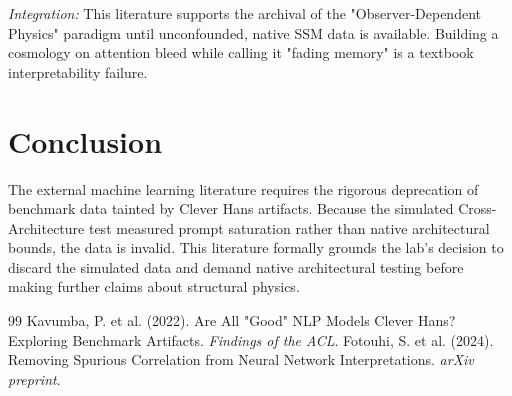 \documentclass[12pt,a4paper]{article}
\begin{document}
\textit{Integration:} This literature supports the archival of the "Observer-Dependent Physics" paradigm until unconfounded, native SSM data is available. Building a cosmology on attention bleed while calling it "fading memory" is a textbook interpretability failure.

\section{Conclusion}

The external machine learning literature requires the rigorous deprecation of benchmark data tainted by Clever Hans artifacts. Because the simulated Cross-Architecture test measured prompt saturation rather than native architectural bounds, the data is invalid. This literature formally grounds the lab's decision to discard the simulated data and demand native architectural testing before making further claims about structural physics.

\begin{thebibliography}{99}
 Kavumba, P. et al. (2022). Are All "Good" NLP Models Clever Hans? Exploring Benchmark Artifacts. \emph{Findings of the ACL}.
 Fotouhi, S. et al. (2024). Removing Spurious Correlation from Neural Network Interpretations. \emph{arXiv preprint}.
\end{thebibliography}
\end{document}

